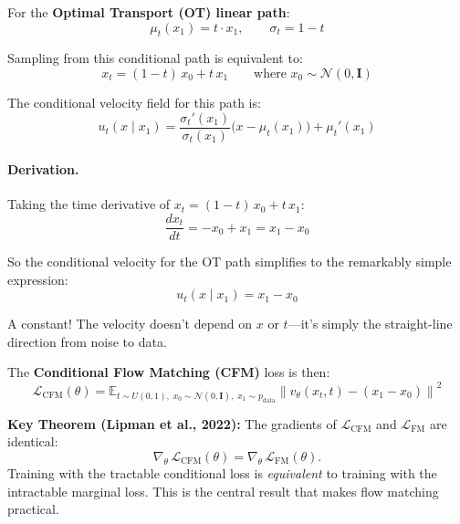\documentclass[11pt, a4paper]{article}
\newcommand{\vtheta}{v_\theta}
\newcommand{\E}{\mathbb{E}}
\newcommand{\N}{\mathcal{N}}
\newcommand{\Id}{\mathbf{I}}
\newcommand{\norm}[1]{\left\lVert #1 \right\rVert}
\begin{document}
For the \textbf{Optimal Transport (OT) linear path}:
\begin{equation}
  \label{eq:ot-path}
  \mu_t(x_1) = t \cdot x_1, \qquad \sigma_t = 1 - t
\end{equation}

Sampling from this conditional path is equivalent to:
\begin{equation}
  \label{eq:interpolation}
  \boxed{x_t = (1 - t)\, x_0 + t\, x_1}
  \qquad \text{where } x_0 \sim \N(0, \Id)
\end{equation}

The conditional velocity field for this path is:
\begin{equation}
  \label{eq:cond-velocity-general}
  u_t(x \mid x_1) = \frac{\sigma_t'(x_1)}{\sigma_t(x_1)}
    \bigl(x - \mu_t(x_1)\bigr) + \mu_t'(x_1)
\end{equation}

\paragraph{Derivation.}
Taking the time derivative of $x_t = (1-t)\,x_0 + t\,x_1$:
\begin{equation}
  \frac{dx_t}{dt} = -x_0 + x_1 = x_1 - x_0
\end{equation}

So the conditional velocity for the OT path simplifies to the remarkably simple
expression:
\begin{equation}
  \label{eq:cond-velocity-ot}
  \boxed{u_t(x \mid x_1) = x_1 - x_0}
\end{equation}

A constant!  The velocity doesn't depend on $x$ or $t$---it's simply the
straight-line direction from noise to data.

The \textbf{Conditional Flow Matching (CFM)} loss is then:
\begin{equation}
  \label{eq:lcfm}
  \boxed{
    \mathcal{L}_{\mathrm{CFM}}(\theta)
    = \E_{t \sim U(0,1),\; x_0 \sim \N(0,\Id),\; x_1 \sim p_{\mathrm{data}}}
      \norm{\vtheta(x_t, t) - (x_1 - x_0)}^2
  }
\end{equation}

\begin{keyinsight}
\textbf{Key Theorem (Lipman et al., 2022):}
The gradients of $\mathcal{L}_{\mathrm{CFM}}$ and $\mathcal{L}_{\mathrm{FM}}$
are identical:
\[
  \nabla_\theta \,\mathcal{L}_{\mathrm{CFM}}(\theta)
  = \nabla_\theta \,\mathcal{L}_{\mathrm{FM}}(\theta).
\]
Training with the tractable conditional loss is \emph{equivalent} to training
with the intractable marginal loss.  This is the central result that makes flow
matching practical.
\end{keyinsight}
\end{document}

